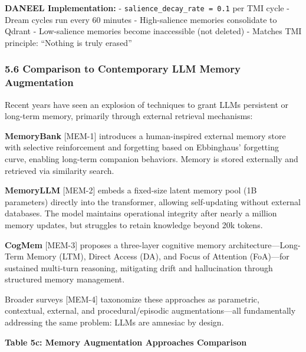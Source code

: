 \documentclass[
  11pt,
]{article}
\begin{document}
\textbf{DANEEL Implementation:} - \texttt{salience\_decay\_rate\ =\ 0.1}
per TMI cycle - Dream cycles run every 60 minutes - High-salience
memories consolidate to Qdrant - Low-salience memories become
inaccessible (not deleted) - Matches TMI principle: ``Nothing is truly
erased''

\subsubsection{5.6 Comparison to Contemporary LLM Memory
Augmentation}\label{comparison-to-contemporary-llm-memory-augmentation}

Recent years have seen an explosion of techniques to grant LLMs
persistent or long-term memory, primarily through external retrieval
mechanisms:

\textbf{MemoryBank} {[}MEM-1{]} introduces a human-inspired external
memory store with selective reinforcement and forgetting based on
Ebbinghaus' forgetting curve, enabling long-term companion behaviors.
Memory is stored externally and retrieved via similarity search.

\textbf{MemoryLLM} {[}MEM-2{]} embeds a fixed-size latent memory pool
(1B parameters) directly into the transformer, allowing self-updating
without external databases. The model maintains operational integrity
after nearly a million memory updates, but struggles to retain knowledge
beyond 20k tokens.

\textbf{CogMem} {[}MEM-3{]} proposes a three-layer cognitive memory
architecture---Long-Term Memory (LTM), Direct Access (DA), and Focus of
Attention (FoA)---for sustained multi-turn reasoning, mitigating drift
and hallucination through structured memory management.

Broader surveys {[}MEM-4{]} taxonomize these approaches as parametric,
contextual, external, and procedural/episodic augmentations---all
fundamentally addressing the same problem: LLMs are amnesiac by design.

\textbf{Table 5c: Memory Augmentation Approaches Comparison}
\end{document}
